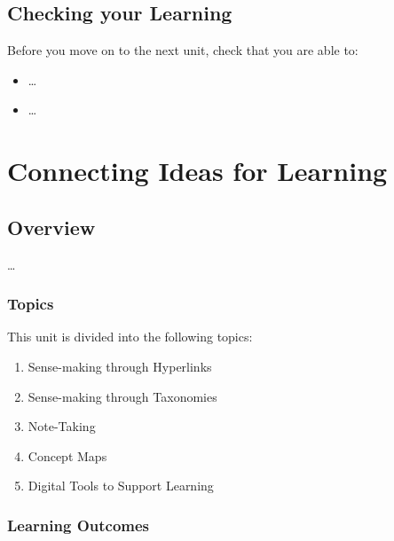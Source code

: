 \documentclass[
]{book}
\providecommand{\tightlist}{%
  \setlength{\itemsep}{0pt}\setlength{\parskip}{0pt}}
\theoremstyle{definition}
\theoremstyle{definition}
\theoremstyle{definition}
\theoremstyle{definition}
\theoremstyle{remark}
\begin{document}
\hypertarget{checking-your-learning-1}{%
\section*{Checking your Learning}\label{checking-your-learning-1}}

\begin{progress}
Before you move on to the next unit, check that you are able to:

\begin{itemize}
\tightlist
\item
  \ldots{}
\item
  \ldots{}
\end{itemize}
\end{progress}

\hypertarget{connecting-ideas-for-learning}{%
\chapter{Connecting Ideas for Learning}\label{connecting-ideas-for-learning}}

\hypertarget{overview-2}{%
\section*{Overview}\label{overview-2}}

\ldots{}

\hypertarget{topics-2}{%
\subsection*{Topics}\label{topics-2}}

This unit is divided into the following topics:

\begin{enumerate}
\def\labelenumi{\arabic{enumi}.}
\tightlist
\item
  Sense-making through Hyperlinks
\item
  Sense-making through Taxonomies
\item
  Note-Taking
\item
  Concept Maps
\item
  Digital Tools to Support Learning
\end{enumerate}

\hypertarget{learning-outcomes-2}{%
\subsection*{Learning Outcomes}\label{learning-outcomes-2}}
\end{document}
